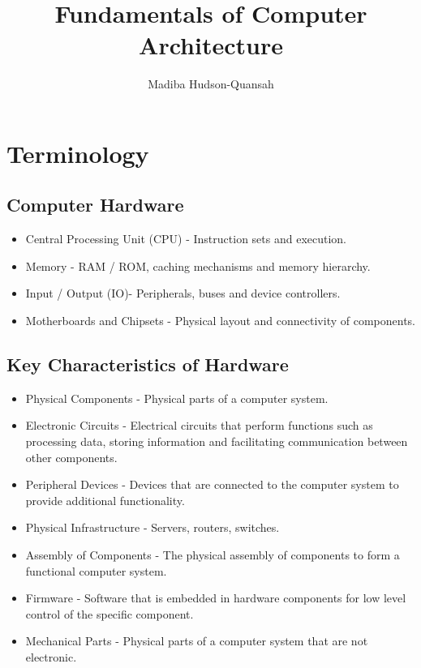 \documentclass[12pt letter]{report}
\title{\Huge{Fundamentals of Computer Architecture}}
\author{\huge{Madiba Hudson-Quansah}}
\date{}
\begin{document}
\maketitle
\newpage
{}
\tableofcontents
\pagebreak

\chapter{Terminology}

\section{Computer Hardware}


\begin{itemize}
  \item Central Processing Unit (CPU) - Instruction sets and execution.
  \item Memory - RAM / ROM, caching mechanisms and memory hierarchy.
  \item Input / Output (IO)- Peripherals, buses and device controllers.
  \item Motherboards and Chipsets - Physical layout and connectivity of components.
\end{itemize}

\section{Key Characteristics of Hardware}

\begin{itemize}
  \item Physical Components - Physical parts of a computer system.
  \item Electronic Circuits - Electrical circuits that perform functions such as processing data, storing information
        and facilitating communication between other components.
  \item Peripheral Devices - Devices that are connected to the computer system to provide additional functionality.
  \item Physical Infrastructure - Servers, routers, switches.
  \item Assembly of Components - The physical assembly of components to form a functional computer system.
  \item Firmware - Software that is embedded in hardware components for low level control of the specific component.
  \item Mechanical Parts - Physical parts of a computer system that are not electronic.
\end{itemize}
\end{document}
